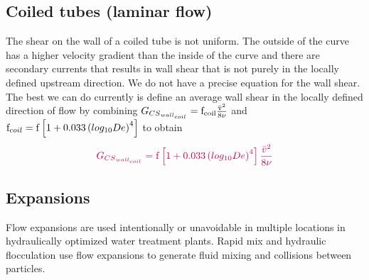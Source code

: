 \documentclass[letterpaper,10pt,english]{sphinxmanual}
\begin{document}
\subsection{Coiled tubes (laminar flow)}
\label{\detokenize{Rapid_Mix/RM_Derivations:heading-coiled-tubes-laminar-flow-1}}\label{\detokenize{Rapid_Mix/RM_Derivations:id2}}
The shear on the wall of a coiled tube is not uniform. The outside of the curve has a higher velocity gradient than the inside of the curve and there are secondary currents that results in wall shear that is not purely in the locally defined upstream direction. We do not have a precise equation for the wall shear. The best we can do currently is define an average wall shear in the locally defined direction of flow by combining
\(G_{{CS}_{wall_{coil}}} =\rm{f_{coil}} \frac{\bar v^2}{8\nu}\) and
\({\rm f}_{coil} = {\rm f} \left[ 1 + 0.033\left(log_{10}De\right)^4 \right]\)
to obtain
\begin{equation}\label{equation:Rapid_Mix/RM_Derivations:Rapid_Mix/RM_Derivations:86}
\begin{split}\color{purple}{
  G_{{CS}_{wall_{coil}}} ={\rm f} \left[ 1 + 0.033 \left(log_{10}De \right)^4 \right]  \frac{\bar v^2}{8\nu}
}\end{split}
\end{equation}

\subsection{Expansions}
\label{\detokenize{Rapid_Mix/RM_Derivations:heading-expansions-1}}\label{\detokenize{Rapid_Mix/RM_Derivations:id3}}
Flow expansions are used intentionally or unavoidable in multiple locations in hydraulically optimized water treatment plants. Rapid mix and hydraulic flocculation use flow expansions to generate fluid mixing and collisions between particles.
\end{document}
